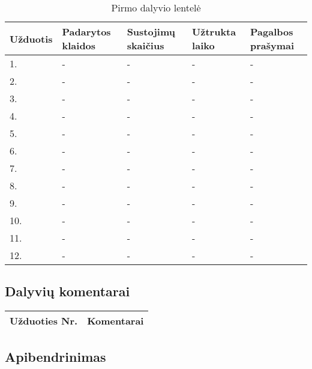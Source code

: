 \documentclass[oneside]{VUMIFPSkursinis}
\begin{document}
\begin{center}
	\begin{table}[!pht]
	\caption{Pirmo dalyvio lentelė}
	\begin{tabular}{ |p{1.8cm} | p{3.4cm} | p{3.4cm} | p{2.5cm} | p{3.5cm}|}
	\hline
	Užduotis&Padarytos klaidos&Sustojimų skaičius&Užtrukta laiko&Pagalbos prašymai\\ \hline
1.&-&-&-&- \\ \hline
2.&-&-&-&- \\ \hline
3.&-&-&-&- \\ \hline
4.&-&-&-&- \\ \hline
5.&-&-&-&- \\ \hline
6.&-&-&-&- \\ \hline
7.&-&-&-&- \\ \hline
8.&-&-&-&- \\ \hline
9.&-&-&-&- \\ \hline
10.&-&-&-&- \\ \hline
11.&-&-&-&- \\ \hline
12.&-&-&-&- \\ \hline
\end{tabular}
\end{table}
\vspace{0.7cm}
\end{center}
\subsection{Dalyvių komentarai}
\begin{center}
	\begin{tabular}{ |p{3cm}| p{12cm} |}
	\hline
Užduoties Nr.&Komentarai\\ \hline
	\end{tabular}
\end{center}
\subsection{Apibendrinimas}
\end{document}
